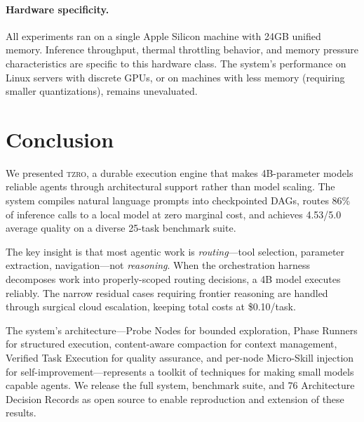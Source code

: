 \documentclass{article}
\begin{document}
\paragraph{Hardware specificity.}
All experiments ran on a single Apple Silicon machine with 24GB unified memory.
Inference throughput, thermal throttling behavior, and memory pressure characteristics are specific to this hardware class.
The system's performance on Linux servers with discrete GPUs, or on machines with less memory (requiring smaller quantizations), remains unevaluated.

\section{Conclusion}
\label{sec:conclusion}

We presented \textsc{tzro}, a durable execution engine that makes 4B-parameter models reliable agents through architectural support rather than model scaling.
The system compiles natural language prompts into checkpointed DAGs, routes 86\% of inference calls to a local model at zero marginal cost, and achieves 4.53/5.0 average quality on a diverse 25-task benchmark suite.

The key insight is that most agentic work is \emph{routing}---tool selection, parameter extraction, navigation---not \emph{reasoning}.
When the orchestration harness decomposes work into properly-scoped routing decisions, a 4B model executes reliably.
The narrow residual cases requiring frontier reasoning are handled through surgical cloud escalation, keeping total costs at \$0.10/task.

The system's architecture---Probe Nodes for bounded exploration, Phase Runners for structured execution, content-aware compaction for context management, Verified Task Execution for quality assurance, and per-node Micro-Skill injection for self-improvement---represents a toolkit of techniques for making small models capable agents.
We release the full system, benchmark suite, and 76 Architecture Decision Records as open source to enable reproduction and extension of these results.





\appendix
\end{document}
